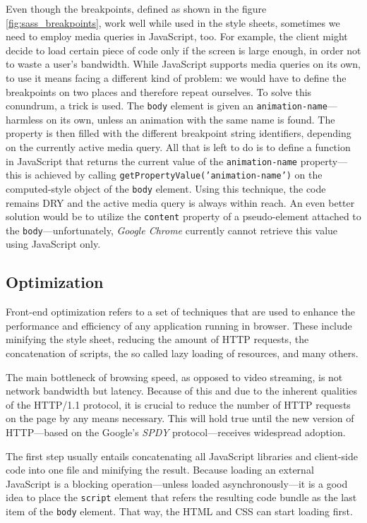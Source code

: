 \documentclass[thesis=M,english,hidelinks]{FITthesis}[2012/10/20]
\newcommand{\code}{\texttt}
\begin{document}
Even though the breakpoints, defined as shown in the figure \ref{fig:sass_breakpoints}, work well while used in the style sheets, sometimes we need to employ media queries in JavaScript, too. For example, the client might decide to load certain piece of code only if the screen is large enough, in order not to waste a user's bandwidth. While JavaScript supports media queries on its own, to use it means facing a different kind of problem: we would have to define the breakpoints on two places and therefore repeat ourselves. To solve this conundrum, a trick is used. The \code{body} element is given an \code{animation-name}---harmless on its own, unless an animation with the same name is found. The property is then filled with the different breakpoint string identifiers, depending on the currently active media query. All that is left to do is to define a function in JavaScript that returns the current value of the \code{animation-name} property---this is achieved by calling \code{getPropertyValue('animation-name')} on the computed-style object of the \code{body} element. Using this technique, the code remains DRY and the active media query is always within reach. An even better solution would be to utilize the \code{content} property of a pseudo-element attached to the \code{body}---unfortunately, \textit{Google Chrome} currently cannot retrieve this value using JavaScript only.

  \subsection{Optimization}

Front-end optimization refers to a set of techniques that are used to enhance the performance and efficiency of any application running in browser. These include  minifying the style sheet, reducing the amount of HTTP requests, the concatenation of scripts, the so called lazy loading of resources, and many others.

The main bottleneck of browsing speed, as opposed to video streaming, is not network bandwidth but latency. Because of this and due to the inherent qualities of the HTTP/1.1 protocol, it is crucial to reduce the number of HTTP requests on the page by any means necessary. This will hold true until the new version of HTTP---based on the Google's \textit{SPDY} protocol---receives widespread adoption.

The first step usually entails concatenating all JavaScript libraries and client-side code into one file and minifying the result. Because loading an external JavaScript is a blocking operation---unless loaded asynchronously---it is a good idea to place the \code{script} element that refers the resulting code bundle as the last item of the \code{body} element. That way, the HTML and CSS can start loading first.
\end{document}
